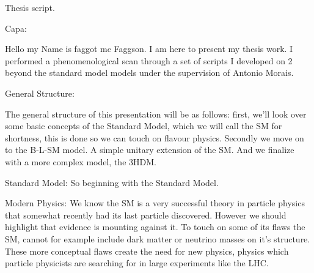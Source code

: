 

% 


Thesis script. 

Capa: 

Hello my Name is faggot mc Faggson. I am here to present my thesis work. I performed a phenomenological scan through a set of scripts I developed on 2 beyond the standard model models under the supervision of Antonio Morais. 

General Structure:

The general structure of this presentation will be as follows: first, we’ll look over some basic concepts of the Standard Model, which we will call the SM for shortness, this is done so we can touch on flavour physics. Secondly we move on to the B-L-SM model. A simple unitary extension of the SM. And we finalize with a more complex model, the 3HDM. 

Standard Model:
So beginning with the Standard Model. 

Modern Physics: 
We know the SM is a very successful theory in particle physics that somewhat recently had its last particle discovered. However we should highlight that evidence is mounting against it. To touch on some of its flaws the SM, cannot for example include dark matter or neutrino masses on it’s structure. These more conceptual flaws create the need for new physics, physics which particle physicists are searching for in large experiments like the LHC. 

